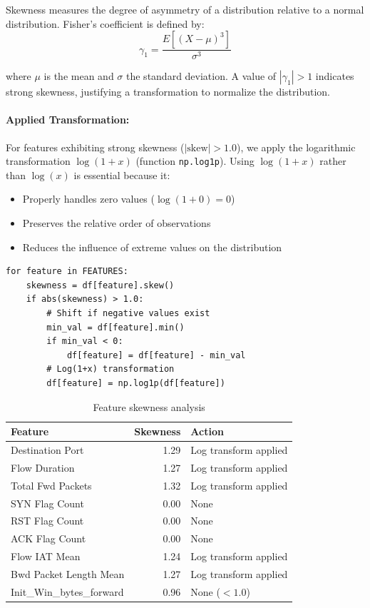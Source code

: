 Skewness measures the degree of asymmetry of a distribution relative to a normal distribution. Fisher's coefficient is defined by:
\begin{equation}
    \gamma_1 = \frac{E[(X - \mu)^3]}{\sigma^3}
\end{equation}

\noindent where $\mu$ is the mean and $\sigma$ the standard deviation. A value of $|\gamma_1| > 1$ indicates strong skewness, justifying a transformation to normalize the distribution.

\paragraph{Applied Transformation:} For features exhibiting strong skewness ($|\text{skew}| > 1.0$), we apply the logarithmic transformation $\log(1 + x)$ (function \texttt{np.log1p}). Using $\log(1+x)$ rather than $\log(x)$ is essential because it:
\begin{itemize}
    \item Properly handles zero values ($\log(1+0) = 0$)
    \item Preserves the relative order of observations
    \item Reduces the influence of extreme values on the distribution
\end{itemize}

\begin{lstlisting}[caption={Skewness analysis and logarithmic transformation}]
for feature in FEATURES:
    skewness = df[feature].skew()
    if abs(skewness) > 1.0:
        # Shift if negative values exist
        min_val = df[feature].min()
        if min_val < 0:
            df[feature] = df[feature] - min_val
        # Log(1+x) transformation
        df[feature] = np.log1p(df[feature])
\end{lstlisting}

\begin{table}[H]
\centering
\caption{Feature skewness analysis}
\label{tab:skewness}
\begin{tabular}{lrl}
\toprule
\textbf{Feature} & \textbf{Skewness} & \textbf{Action} \\
\midrule
Destination Port & 1.29 & Log transform applied \\
Flow Duration & 1.27 & Log transform applied \\
Total Fwd Packets & 1.32 & Log transform applied \\
SYN Flag Count & 0.00 & None \\
RST Flag Count & 0.00 & None \\
ACK Flag Count & 0.00 & None \\
Flow IAT Mean & 1.24 & Log transform applied \\
Bwd Packet Length Mean & 1.27 & Log transform applied \\
Init\_Win\_bytes\_forward & 0.96 & None ($< 1.0$) \\
\bottomrule
\end{tabular}
\end{table}

